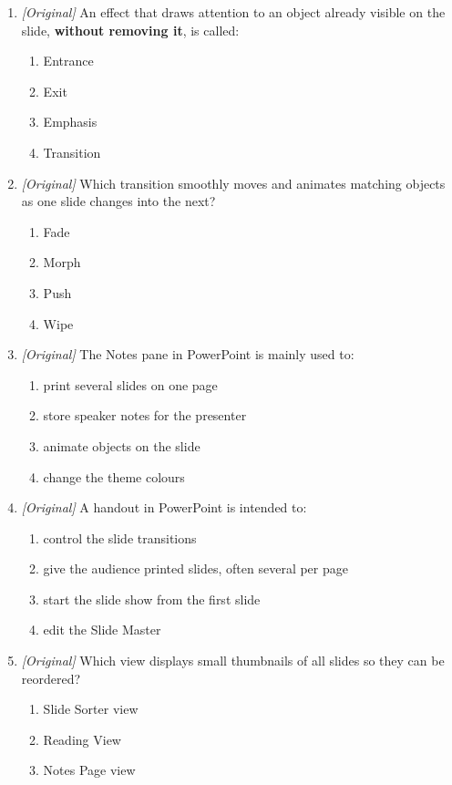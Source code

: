 \documentclass[11pt]{article}
\begin{document}
\begin{enumerate}[label=\textbf{Q\arabic*.}, leftmargin=*]
\item \textit{[Original]} An effect that draws attention to an object already
  visible on the slide, \textbf{without removing it}, is called:
  \begin{enumerate}[label=\Alph*.]
    \item Entrance
    \item Exit
    \item Emphasis
    \item Transition
  \end{enumerate}
\item \textit{[Original]} Which transition smoothly moves and animates matching
  objects as one slide changes into the next?
  \begin{enumerate}[label=\Alph*.]
    \item Fade
    \item Morph
    \item Push
    \item Wipe
  \end{enumerate}
\item \textit{[Original]} The Notes pane in PowerPoint is mainly used to:
  \begin{enumerate}[label=\Alph*.]
    \item print several slides on one page
    \item store speaker notes for the presenter
    \item animate objects on the slide
    \item change the theme colours
  \end{enumerate}
\item \textit{[Original]} A handout in PowerPoint is intended to:
  \begin{enumerate}[label=\Alph*.]
    \item control the slide transitions
    \item give the audience printed slides, often several per page
    \item start the slide show from the first slide
    \item edit the Slide Master
  \end{enumerate}
\item \textit{[Original]} Which view displays small thumbnails of all slides so
  they can be reordered?
  \begin{enumerate}[label=\Alph*.]
    \item Slide Sorter view
    \item Reading View
    \item Notes Page view

\end{enumerate}
\end{enumerate}
\end{document}
